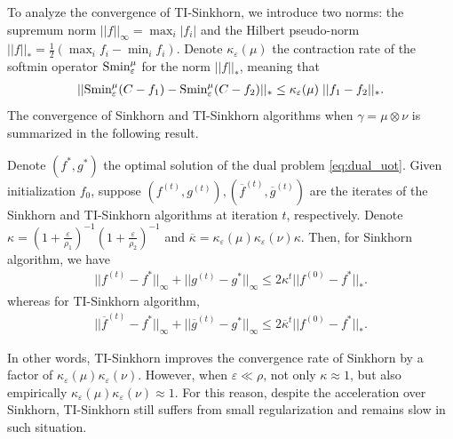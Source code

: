 To analyze the convergence of TI-Sinkhorn, we introduce two norms:
the supremum norm $||f||_{\infty} = \max_i | f_i|$ and the
Hilbert pseudo-norm $||f||_* = \frac{1}{2} \left( \max_i f_i - \min_i f_i \right)$.
Denote $\kappa_{\varepsilon}(\mu)$ the contraction rate of the softmin operator
$\text{Smin}_{\varepsilon}^{\mu}$ for the norm $||f||_*$, meaning that
\begin{align}
  ||\text{Smin}_{\varepsilon}^{\mu}(C - f_1) - \text{Smin}_{\varepsilon}^{\mu}(C - f_2) ||_* \leq
  \kappa_{\varepsilon}(\mu) \; || f_1 - f_2 ||_*.
\end{align}
The convergence of Sinkhorn and TI-Sinkhorn algorithms when $\gamma = \mu \otimes \nu$
is summarized in the following result.
\begin{proposition}
   Denote $(f^*, g^*)$ the optimal solution of
  the dual problem \eqref{eq:dual_uot}. Given initialization $f_0$, suppose
  $(f^{(t)}, g^{(t)}), (\overline{f}^{(t)}, \overline{g}^{(t)})$ are the iterates
  of the Sinkhorn and TI-Sinkhorn algorithms at iteration $t$, respectively. Denote
  $\kappa = \left( 1 + \frac{\varepsilon}{\rho_1} \right)^{-1}
  \left( 1 + \frac{\varepsilon}{\rho_2} \right)^{-1}$
  and $\overline{\kappa} = \kappa_{\varepsilon}(\mu) \kappa_{\varepsilon}(\nu) \kappa$. Then,
  for Sinkhorn algorithm, we have
  \begin{align}
    || f^{(t)} - f^* ||_{\infty} + || g^{(t)} - g^* ||_{\infty} \leq
    2 \kappa^t || f^{(0)} - f^* ||_*.
  \end{align}
  whereas for TI-Sinkhorn algorithm,
  \begin{align}
    || \overline{f}^{(t)} - f^* ||_{\infty} + || \overline{g}^{(t)} - g^* ||_{\infty} \leq
    2 \overline{\kappa}^t || f^{(0)} - f^* ||_*.
  \end{align}
\end{proposition}
In other words, TI-Sinkhorn improves the convergence rate of Sinkhorn by a factor of
$\kappa_{\varepsilon}(\mu) \kappa_{\varepsilon}(\nu)$. However, when $\varepsilon \ll \rho$,
not only $\kappa \approx 1$, but also empirically
$\kappa_{\varepsilon}(\mu) \kappa_{\varepsilon}(\nu) \approx 1$.
For this reason, despite the acceleration over Sinkhorn,
TI-Sinkhorn still suffers from small regularization and remains slow in such situation.

